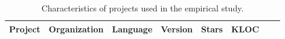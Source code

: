 \begin{table}[t]
    \centering
    \caption{
        \label{tab:subject_table}
        Characteristics of projects used in the empirical study.
    }
    \renewcommand{\arraystretch}{1.2}
    \begin{tabular}{@{}lllrrrrr@{}}
        \toprule
            {\bf Project}
            &
            {\bf Organization}
            &
            {\bf Language}
            &
            {\bf Version}
            &
            {\bf Stars}
            &
            {\bf KLOC}
            \\
        \midrule
        
        \bottomrule
    \end{tabular}
    \vspace{-1em}
\end{table}
